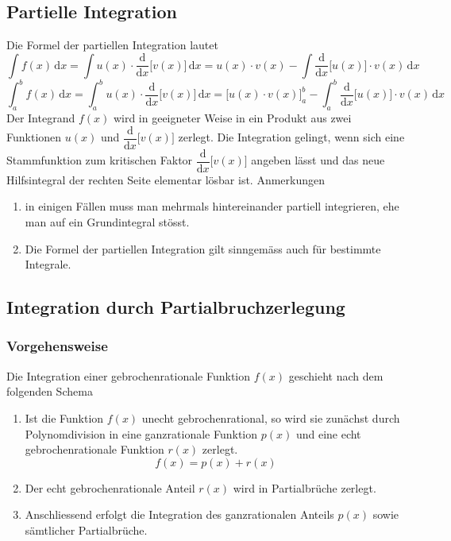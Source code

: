 \subsection{Partielle Integration}
Die Formel der partiellen Integration lautet
\begin{equation}
\boxed{\displaystyle \int f\left(x\right)\,\text{d}x=\displaystyle \int u\left(x\right)\cdot \dfrac{\text{d}}{\text{d}x}\Big[v\left(x\right)\Big]\,\text{d}x=u\left(x\right)\cdot v\left(x\right)-\displaystyle \int \dfrac{\text{d}}{\text{d}x}\Big[u\left(x\right)\Big]\cdot v\left(x\right)\,\text{d}x}
\end{equation}
\begin{equation}
\boxed{\displaystyle \int_a^b f\left(x\right)\,\text{d}x=\displaystyle \int_a^b u\left(x\right)\cdot \dfrac{\text{d}}{\text{d}x}\Big[v\left(x\right)\Big]\,\text{d}x=\Bigg[u\left(x\right)\cdot v\left(x\right)\Bigg]_a^b-\displaystyle \int_a^b \dfrac{\text{d}}{\text{d}x}\Big[u\left(x\right)\Big]\cdot v\left(x\right)\,\text{d}x}
\end{equation}
Der Integrand $f\left(x\right)$ wird in geeigneter Weise in ein Produkt aus zwei Funktionen $u\left(x\right)$ und $\dfrac{\text{d}}{\text{d}x}\Big[v\left(x\right)\Big]$ zerlegt. Die Integration gelingt, wenn sich eine Stammfunktion zum kritischen Faktor $\dfrac{\text{d}}{\text{d}x}\Big[v\left(x\right)\Big]$ angeben lässt und das neue Hilfsintegral der rechten Seite elementar lösbar ist.
\newline\newline
Anmerkungen
\begin{enumerate}[$(a)$]
\item in einigen Fällen muss man mehrmals hintereinander partiell integrieren, ehe man auf ein Grundintegral stösst.
\item Die Formel der partiellen Integration gilt sinngemäss auch für bestimmte Integrale.
\end{enumerate}
\subsection{Integration durch Partialbruchzerlegung}
\subsubsection{Vorgehensweise}
Die Integration einer gebrochenrationale Funktion $f\left(x\right)$ geschieht nach dem folgenden Schema
\begin{enumerate}[$(a)$]
\item Ist die Funktion $f\left(x\right)$ unecht gebrochenrational, so wird sie zunächst durch Polynomdivision in eine ganzrationale Funktion $p\left(x\right)$ und eine echt gebrochenrationale Funktion $r\left(x\right)$ zerlegt. 
\begin{equation}
\boxed{f\left(x\right)=p\left(x\right)+r\left(x\right)}
\end{equation}
\item Der echt gebrochenrationale Anteil $r\left(x\right)$ wird in Partialbrüche zerlegt.
\item Anschliessend erfolgt die Integration des ganzrationalen Anteils $p\left(x\right)$ sowie sämtlicher Partialbrüche.
\end{enumerate}
